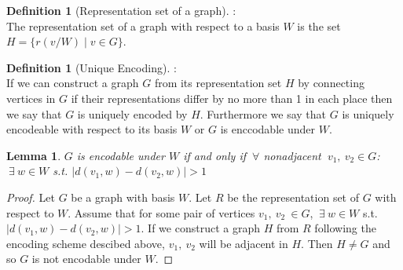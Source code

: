 \documentclass[11pt]{amsart}
\theoremstyle{plain}  %
\newtheorem{lem}[thm]{Lemma}
\theoremstyle{definition}
\newtheorem{defin}[thm]{{Definition}}
\theoremstyle{remark}
\numberwithin{equation}{thm}
\begin{document}
  \begin{defin}[Representation set of a graph]:\\
  The representation set of a graph with respect to a basis $W$ is the set $H=\{r(v/W)\mid v\in G\}$.   
  \end{defin}

  \begin{defin}[Unique Encoding]:\\
   If we can construct a graph $G$ from its representation set $H$ by connecting vertices in $G$ 
   if their representations differ by no more than 1 in each place then we say that $G$ is uniquely encoded by $H$.
   Furthermore we say that $G$ is uniquely encodeable with respect to its basis $W$ or $G$ is enccodable under $W$.
  \end{defin}

\begin{lem}
$G$ is encodable under $W$ if and only if $\ \forall$ nonadjacent $\ v_1,\ v_2\in G$:\\
$\ \exists\ w \in W$ s.t. $\left| d(v_1,w)-d(v_2,w)\right| > 1$ 
\end{lem}
\begin{proof}
Let $G$ be a graph with basis $W$. Let $R$ be the representation set of $G$ with respect to $W$. 
Assume that for some pair of vertices $v_1,\ v_2\ \in G$, $\ \exists\ w \in W$ s.t. $\left| d(v_1,w)-d(v_2,w)\right| > 1$.
If we construct a graph $H$ from $R$ following the encoding scheme descibed above, $v_1,\ v_2$ will be adjacent in $H$. 
Then $H \neq G$ and so $G$ is not encodable under $W$.
\end{proof}
\end{document}
